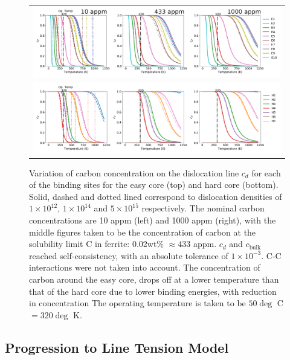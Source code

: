 \documentclass[a4paper,11pt]{article}
\begin{document}
\begin{landscape}
   \begin{figure}	
       \begin{tabular}{c}
      	        \includegraphics[width=1.65\textwidth]{../Images/cd_easy_core_ferrite_sc_all_10_433_1000_appm.png}  \\
      	        \includegraphics[width=1.65\textwidth]{../Images/cd_hard_core_ferrite_sc_all_10_433_1000_appm.png}  \\

          	   \end{tabular}		
   \caption{ Variation of carbon concentration on the dislocation line $c_d$ for each of the binding sites for the easy core (top) and hard core (bottom). Solid, dashed and dotted lined correspond to dislocation densities of $1\times10^{12}$, $1\times10^{14}$ and $5\times10^{15}$ respectively. The nominal carbon concentrations are 10 appm (left) and 1000 appm (right), with the middle figures taken to be the concentration of carbon at the solubility limit C in ferrite: 0.02wt\% $\approx433$ appm. $c_d$ and $c_{\text{bulk}}$ reached self-consistency, with an absolute tolerance of $1\times10^{-3}$. C-C interactions were not taken into account. The concentration of carbon around the easy core, drops off at a lower temperature than that of the hard core due to lower binding energies, with reduction in concentration  The operating temperature is taken to be $50\deg$ C $= 320 \deg$ K. }
   \label{cdhardeasy}
      \end{figure}
      \end{landscape}






\subsection{Progression to Line Tension Model}
\label{sec:org3eb22ba}
\end{document}
